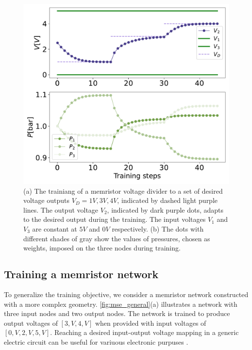 \documentclass[reprint,superscriptaddress,prb,showkeys]{revtex4-2}
\begin{document}
\begin{figure}[h]
    \centering
    \includegraphics[width=0.8\columnwidth]{plots/voltage_divider/evolution_targets.pdf}
    \caption{(a) The trainiang of a memristor voltage divider to a set of desired voltage outputs $V_D = {1V, 3V, 4V}$, indicated by dashed light purple lines. The output voltage $V_2$, indicated by dark purple dots, adapts to the desired output during the training. The input voltages $V_1$ and $V_3$ are constant at $5V$ and $0V$ respectively. (b) The dots with different shades of gray show the values of pressures, chosen as weights, imposed on the three nodes during training.}\label{fig:evolution_targets}
\end{figure}

\subsection{\label{sec:train_memr_nw}Training a memristor network}

To generalize the training objective, we consider a memristor network constructed with a more complex geometry. \cref{fig:mse_general}(a) illustrates a network with three input nodes and two output nodes. The network is trained to produce output voltages of $[3,V, 4,V]$ when provided with input voltages of $[0,V, 2,V, 5,V]$.  Reaching a desired input-output voltage mapping in a generic electric circuit can be useful for variuous electronic purpuses \cite{voltage_controlled_oscillator, onchip_powerdistributed}. 
\end{document}
